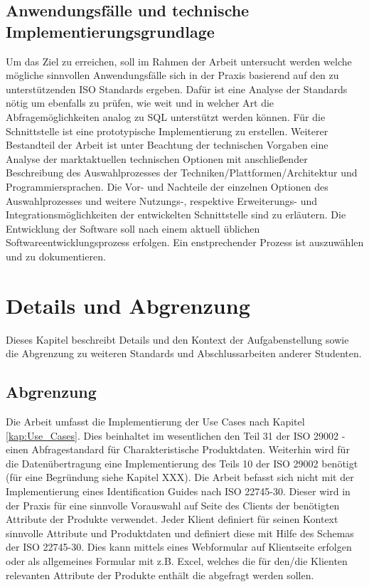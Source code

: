 \subsection{Anwendungsfälle und technische Implementierungsgrundlage}

Um das Ziel zu erreichen, soll im Rahmen der Arbeit untersucht werden welche mögliche sinnvollen Anwendungsfälle sich in der Praxis basierend auf den zu unterstützenden ISO Standards ergeben. Dafür ist eine Analyse der Standards nötig um ebenfalls zu prüfen, wie weit und in welcher Art die Abfragemöglichkeiten analog zu SQL unterstützt werden können. Für die Schnittstelle ist eine prototypische Implementierung zu erstellen. Weiterer Bestandteil der Arbeit ist unter Beachtung der technischen Vorgaben eine Analyse der marktaktuellen technischen Optionen mit anschließender Beschreibung des Auswahlprozesses der Techniken/Plattformen/Architektur und Programmiersprachen. Die Vor- und Nachteile der einzelnen Optionen des Auswahlprozesses und weitere Nutzungs-, respektive Erweiterungs- und Integrationsmöglichkeiten der entwickelten Schnittstelle sind zu erläutern. 
Die Entwicklung der Software soll nach einem aktuell üblichen Softwareentwicklungsprozess erfolgen. Ein enstprechender Prozess ist auszuwählen und zu dokumentieren. 

\section{Details und Abgrenzung}

Dieses Kapitel beschreibt Details und den Kontext der Aufgabenstellung sowie die Abgrenzung zu weiteren Standards und Abschlussarbeiten anderer Studenten. 

\subsection{Abgrenzung}

Die Arbeit umfasst die Implementierung der Use Cases nach Kapitel \ref{kap:Use_Cases}. Dies beinhaltet im wesentlichen den Teil 31 der ISO 29002 - einen Abfragestandard für Charakteristische Produktdaten. Weiterhin wird für die Datenübertragung eine Implementierung des Teils 10 der ISO 29002 benötigt (für eine Begründung siehe Kapitel XXX). Die Arbeit befasst sich nicht mit der Implementierung eines Identification Guides nach ISO 22745-30. Dieser wird in der Praxis für eine sinnvolle Vorauswahl auf Seite des Clients der benötigten Attribute der Produkte verwendet. Jeder Klient definiert für seinen Kontext sinnvolle Attribute und Produktdaten und definiert diese mit Hilfe des Schemas der ISO 22745-30. Dies kann mittels eines Webformular auf Klientseite erfolgen oder als allgemeines Formular mit z.B. Excel, welches die für den/die Klienten relevanten Attribute der Produkte enthält die abgefragt werden sollen. 

